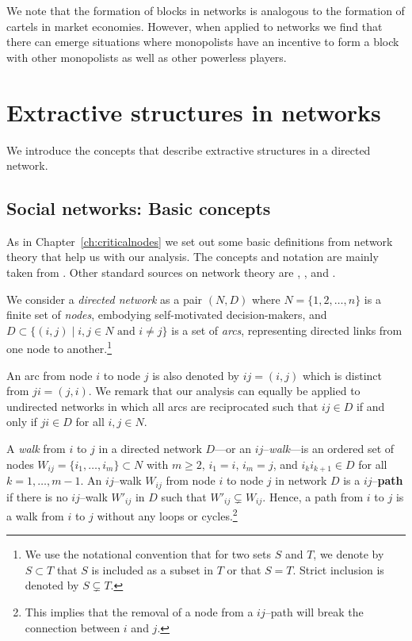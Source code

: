 We note that the formation of blocks in networks is analogous to the formation of cartels in market economies. However, when applied to networks we find that there can emerge situations where monopolists have an incentive to form a block with other monopolists as well as other powerless players.

\section{Extractive structures in networks}

We introduce the concepts that describe extractive structures in a directed network.

\subsection{Social networks: Basic concepts}

As in Chapter~\ref{ch:criticalnodes} we set out some basic definitions from network theory that help us with our analysis. The concepts and notation are mainly taken from \citet{Jackson2008}. Other standard sources on network theory are \citet{Newman2006book}, \citet{Goyal2007}, \citet{Newman2010} and \citet{Gilles2010}.

We consider a \emph{directed network} as a pair $(N,D)$ where $N=\{1 , 2 , \ldots , n\}$ is a finite set of \emph{nodes}, embodying self-motivated decision-makers, and $D \subset \{(i,j) \mid i,j \in N \mbox{ and } i \neq j\}$ is a set of \emph{arcs}, representing directed links from one node to another.\footnote{We use the notational convention that for two sets $S$ and $T$, we denote by $S \subset T$ that $S$ is included as a subset in $T$ or that $S=T$. Strict inclusion is denoted by $S \subsetneq T$.}

An arc from node $i$ to node $j$ is also denoted by $ij = (i,j)$ which is distinct from $ji = (j,i)$. We remark that our analysis can equally be applied to undirected networks in which all arcs are reciprocated such that $ij \in D$ if and only if $ji \in D$ for all $i,j \in N$.

A \textit{walk} from $i$ to $j$ in a directed network $D$---or an $ij$--\textit{walk}---is an ordered set of nodes $W_{ij} = \{ i_{1}, \ldots ,i_{m} \} \subset N$ with $m \geq 2$, $i_1 =i$, $i_m =j$, and $i_{k}i_{k+1} \in D$ for all $k=1, \ldots ,m-1$. An $ij$--walk $W_{ij}$ from node $i$ to node $j$ in network $D$ is a $ij$--\textbf{path} if there is no $ij$--walk $W'_{ij}$ in $D$ such that $W'_{ij} \subsetneq W_{ij}$. Hence, a path from $i$ to $j$ is a walk from $i$ to $j$ without any loops or cycles.\footnote{This implies that the removal of a node from a $ij$--path will break the connection between $i$ and $j$.}

